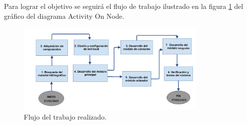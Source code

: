 \documentclass[a4paper, 12pt]{article}
\begin{document}
\vskip 0.2cm 
Para lograr el objetivo se seguirá el flujo de trabajo ilustrado en la figura \ref{fig:diagrama} del gráfico del diagrama Activity On Node.

\begin{figure}[ht]
\begin{center}
\includegraphics[width=0.82\textwidth]{AoN}
\end{center}
\begin{center}
\vskip -0.5cm
\caption{\small{Flujo del trabajo realizado.}}
\label{fig:diagrama}
\end{center}
\end{figure}
\end{document}
